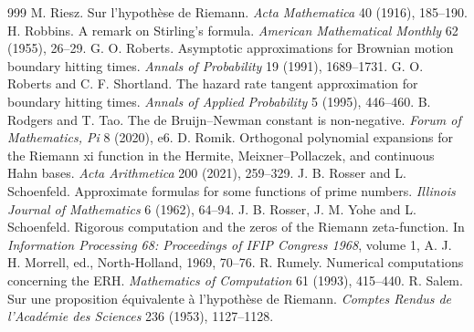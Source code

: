 \begin{thebibliography}{999}
 M. Riesz. Sur l'hypoth\`ese de Riemann. \emph{Acta Mathematica} 40 (1916), 185--190.
 H. Robbins. A remark on Stirling's formula. \emph{American Mathematical Monthly} 62 (1955), 26--29.
 G. O. Roberts. Asymptotic approximations for Brownian motion boundary hitting times. \emph{Annals of Probability} 19 (1991), 1689--1731.
 G. O. Roberts and C. F. Shortland. The hazard rate tangent approximation for boundary hitting times. \emph{Annals of Applied Probability} 5 (1995), 446--460.
 B. Rodgers and T. Tao. The de Bruijn--Newman constant is non-negative. \emph{Forum of Mathematics, Pi} 8 (2020), e6.
 D. Romik. Orthogonal polynomial expansions for the Riemann xi function in the Hermite, Meixner--Pollaczek, and continuous Hahn bases. \emph{Acta Arithmetica} 200 (2021), 259--329.
 J. B. Rosser and L. Schoenfeld. Approximate formulas for some functions of prime numbers. \emph{Illinois Journal of Mathematics} 6 (1962), 64--94.
 J. B. Rosser, J. M. Yohe and L. Schoenfeld. Rigorous computation and the zeros of the Riemann zeta-function. In \emph{Information Processing 68: Proceedings of IFIP Congress 1968}, volume 1, A. J. H. Morrell, ed., North-Holland, 1969, 70--76.
 R. Rumely. Numerical computations concerning the ERH. \emph{Mathematics of Computation} 61 (1993), 415--440.
 R. Salem. Sur une proposition \'equivalente \`a l'hypoth\`ese de Riemann. \emph{Comptes Rendus de l'Acad\'emie des Sciences} 236 (1953), 1127--1128.

\end{thebibliography}
